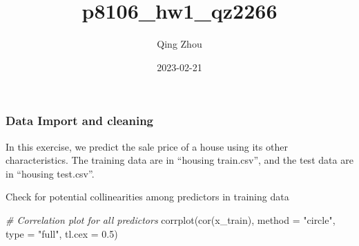 \documentclass[
]{article}
\title{p8106\_hw1\_qz2266}
\author{Qing Zhou}
\date{2023-02-21}
\newenvironment{Shaded}{\begin{snugshade}}{\end{snugshade}}
\newcommand{\AttributeTok}[1]{\textcolor[rgb]{0.77,0.63,0.00}{#1}}
\newcommand{\CommentTok}[1]{\textcolor[rgb]{0.56,0.35,0.01}{\textit{#1}}}
\newcommand{\DecValTok}[1]{\textcolor[rgb]{0.00,0.00,0.81}{#1}}
\newcommand{\FloatTok}[1]{\textcolor[rgb]{0.00,0.00,0.81}{#1}}
\newcommand{\FunctionTok}[1]{\textcolor[rgb]{0.00,0.00,0.00}{#1}}
\newcommand{\NormalTok}[1]{#1}
\newcommand{\OtherTok}[1]{\textcolor[rgb]{0.56,0.35,0.01}{#1}}
\newcommand{\SpecialCharTok}[1]{\textcolor[rgb]{0.00,0.00,0.00}{#1}}
\newcommand{\StringTok}[1]{\textcolor[rgb]{0.31,0.60,0.02}{#1}}
\begin{document}
\maketitle

\hypertarget{data-import-and-cleaning}{%
\subsubsection{Data Import and
cleaning}\label{data-import-and-cleaning}}

In this exercise, we predict the sale price of a house using its other
characteristics. The training data are in ``housing train.csv'', and the
test data are in ``housing test.csv''.

\begin{Shaded}
\end{Shaded}

Check for potential collinearities among predictors in training data

\begin{Shaded}
\begin{Highlighting}[]
\CommentTok{\# Correlation plot for all predictors}
\FunctionTok{corrplot}\NormalTok{(}\FunctionTok{cor}\NormalTok{(x\_train), }\AttributeTok{method =} \StringTok{"circle"}\NormalTok{, }\AttributeTok{type =} \StringTok{"full"}\NormalTok{, }\AttributeTok{tl.cex =} \FloatTok{0.5}\NormalTok{)}
\end{Highlighting}
\end{Shaded}
\end{document}
